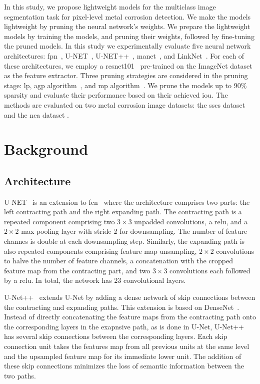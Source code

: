\documentclass[mathematics,article,submit,pdftex,moreauthors]{Definitions/mdpi}
\begin{document}
In this study, we propose lightweight
models for the multiclass image segmentation
task for pixel-level metal corrosion detection.
We make the models lightweight by pruning the neural 
network's weights. We prepare the lightweight models
by training the models, and pruning their weights, followed
by fine-tuning the pruned models. 
In this study
we experimentally evaluate five neural network
architectures: \ac{fpn}~\cite{Lin2017}, U-NET~\cite{Ronneberger2015},
U-NET++~\cite{Zhou2018}, \ac{manet}~\cite{Fan2020}, and 
LinkNet~\cite{Chaurasia2017}. For each of these architectures,
we employ a \ac{resnet101}~\cite{He2016} pre-trained on the ImageNet
dataset as the feature extractor. Three pruning strategies
are considered in the pruning stage:
\ac{lp}, \ac{agp} algorithm~\cite{Han2017},
and \ac{mp} algorithm~\cite{Sanh2020}. We prune
the models up to $90\%$ sparsity and 
evaluate their performance based on their
achieved \ac{iou}. The methods
are evaluated on two metal corrosion image datasets: 
the \ac{sscs} dataset \cite{Bianchi2021Dataset,Bianchi2022Journal} and 
the \ac{nea} dataset \cite{Liu2023}. 

\section{Background}
\subsection{Architecture}
U-NET~\cite{Ronneberger2015} is an extension to
 \ac{fcn}~\cite{Long2015} where the architecture
 comprises two parts: the left contracting path
 and the right expanding path. The contracting
 path is a repeated component comprising two $3\times 3$
 unpadded convolutions, a \ac{relu}, and a $2\times 2 $ max
 pooling layer with stride 2 for downsampling. The
 number of feature channes is double at each downsampling
 step. Similarly, the expanding path is also 
 repeated components comprising feature map unsampling,
 $2\times 2$ convolutions to halve the number of feature channels, 
 a concatenation with the cropped feature map from
 the contracting part, and two $3\times 3$ convolutions
 each followed by a \ac{relu}. In total, the network
 has 23 convolutional layers.

U-Net++~\cite{Zhou2018} extends U-Net by adding a dense
network of skip connections between the contracting
and expanding paths. This extension is based on 
DenseNet~\cite{Huang2017}. Instead of directly concatenating
the feature maps from the contracting path onto the corresponding
layers in the exapnsive path, as is done in U-Net, U-Net++
has several skip connections between the corresponding layers.
Each skip connection unit takes the features map from all
previous units at the same level and the upsampled feature map
for its immediate lower unit. The addition of these
skip connections minimizes the loss of semantic information
between the two paths.
\end{document}
